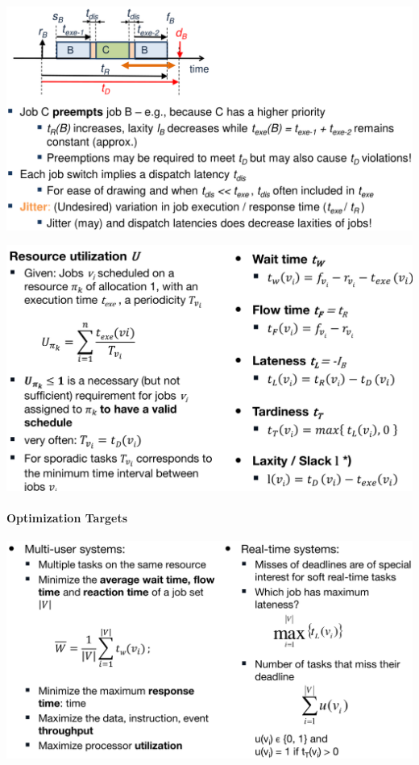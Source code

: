 \documentclass[english]{latex4ei/latex4ei_sheet}
\begin{document}
\begin{center}
  \centering
  \includegraphics[width=\linewidth]{assets/RealTimeParameters2.png}
  \label{fig:realtimeparameters2}
\end{center}

\begin{center}
  \centering
  \includegraphics[width=\linewidth]{assets/SchedulingTimingMetrics.png}
  \label{fig:schedulingtimingmetrics}
\end{center}

\paragraph{Optimization Targets}

\begin{center}
  \centering
  \includegraphics[width=\linewidth]{assets/OptimizationTargets.png}
  \label{fig:optimizationtargets}
\end{center}
\end{document}
